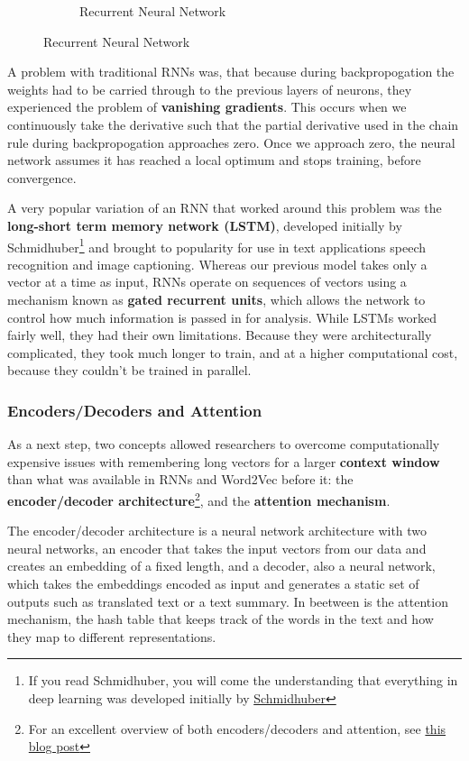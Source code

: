 \documentclass[11pt, table]{diazessay} %
\begin{document}
\begin{sloppypar}
\begin{figure}[H]
\begin{subfigure}[b]{0.4\linewidth}
\begin{tikzpicture}
\end{tikzpicture}
\caption{Recurrent Neural Network}
\end{subfigure}
\end{figure}

A problem with traditional RNNs was, that because during backpropogation the weights had to be carried through to the previous layers of neurons, they experienced the problem of \textbf{vanishing gradients}. This occurs when we continuously take the derivative such that the partial derivative used in the chain rule during backpropogation approaches zero. Once we approach zero, the neural network assumes it has reached a local optimum and stops training, before convergence. 

A very popular variation of an RNN that worked around this problem was the \textbf{long-short term memory network (LSTM)}, developed initially by Schmidhuber\footnote{If you read Schmidhuber, you will come the understanding that everything in deep learning was developed initially by \href{https://people.idsia.ch/~juergen/deep-learning-miraculous-year-1990-1991.html}{Schmidhuber}} and brought to popularity for use in text applications speech recognition and image captioning\citep{karpathy_2015}.  Whereas our previous model takes only a vector at a time as input, RNNs operate on sequences of vectors using a mechanism known as \textbf{gated recurrent units}, which allows the network to control how much information is passed in for analysis. While LSTMs worked fairly well, they had their own limitations. Because they were architecturally complicated, they took much longer to train, and at a higher computational cost, because they couldn't be trained in parallel. 

\subsubsection{Encoders/Decoders and Attention}
As a next step, two concepts allowed researchers to overcome computationally expensive issues with remembering long vectors for a larger \textbf{context window} than what was available in RNNs and Word2Vec before it: the \textbf{encoder/decoder architecture}\footnote{For an excellent overview of both encoders/decoders and attention, see  \href{https://lilianweng.github.io/posts/2018-06-24-attention/}{this blog post}}, and the \textbf{attention mechanism}. 

The encoder/decoder architecture is a neural network  architecture with two neural networks, an encoder that takes the input vectors from our data and creates an embedding of a fixed length, and a decoder, also a neural network, which takes the embeddings encoded as input and generates a static set of outputs such as translated text or a text summary. In beetween is the attention mechanism, the hash table that keeps track of the words in the text and how they map to different representations. 


\end{sloppypar}
\end{document}
